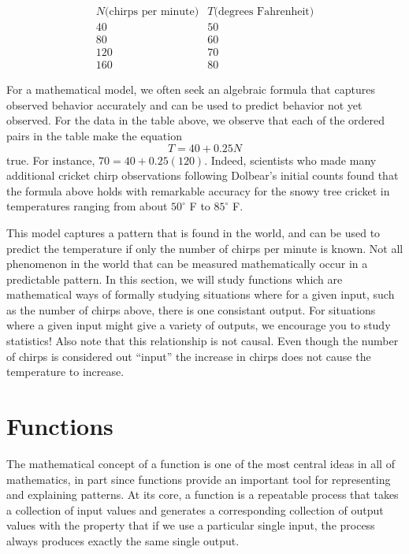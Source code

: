 \documentclass[noauthor, nooutcomes]{ximera}
\begin{document}
$$
\begin{array}{cc}
N \text{(chirps per minute)} & T \text{(degrees Fahrenheit)}\\
\hline
40&50\\
80&60\\
120&70\\
160&80
\end{array}
$$

For a mathematical model, we often seek an algebraic formula that captures observed behavior accurately and can be used to predict behavior not yet observed.  For the data in the table above, we observe that each of the ordered pairs in the table make the equation%
\begin{equation*}
T = 40 + 0.25N
\end{equation*}
true.  For instance, $70 = 40 + 0.25(120)$.  Indeed, scientists who made many additional cricket chirp observations following Dolbear's initial counts found that the formula above holds with remarkable accuracy for the snowy tree cricket in temperatures ranging from about $50^\circ$ F to $85^\circ$ F.

This model captures a pattern that is found in the world, and can be used to predict the temperature if only the number of chirps per minute is known.  Not all phenomenon in the world that can be measured mathematically occur in a predictable pattern.  In this section, we will study functions which are mathematical ways of formally studying situations where for a given input, such as the number of chirps above, there is one consistant output.  For situations where a given input might give a variety of outputs, we encourage you to study statistics! Also note that this relationship is not causal. Even though the number of chirps is considered out ``input'' the increase in chirps does not cause the temperature to increase. 

\section{Functions}
The mathematical concept of a function is one of the most central ideas in all of mathematics, in part since functions provide an important tool for representing and explaining patterns.  At its core, a function is a repeatable process that takes a collection of input values and generates a corresponding collection of output values with the property that if we use a particular single input, the process always produces exactly the same single output.
\end{document}
